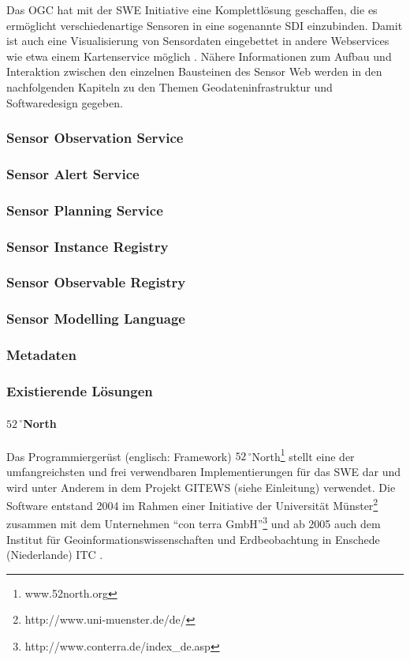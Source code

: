 \citep{botts_ogc_2008}\citep{woolf_gigas_2008}\citep{kunkel_teodoor:_2012}\citep{walkowski_sensor_2008}

Das \gls{OGC} hat mit der \gls{SWE} Initiative eine Komplettlösung geschaffen, die es ermöglicht verschiedenartige Sensoren in eine sogenannte  \gls{SDI} einzubinden. Damit ist auch eine Visualisierung von Sensordaten eingebettet in andere Webservices wie etwa einem Kartenservice möglich \citep{broring_new_2011}. Nähere Informationen zum Aufbau und Interaktion zwischen den einzelnen Bausteinen des Sensor Web werden in den nachfolgenden Kapiteln zu den Themen Geodateninfrastruktur und Softwaredesign gegeben.

\subsubsection{Sensor Observation Service}
\subsubsection{Sensor Alert Service}
\subsubsection{Sensor Planning Service}
\subsubsection{Sensor Instance Registry}
\subsubsection{Sensor Observable Registry}
\subsubsection{Sensor Modelling Language}
\subsubsection{Metadaten}

\subsubsection{Existierende Lösungen}
\paragraph{$52\,^{\circ}$North}
Das Programmiergerüst (englisch: Framework) $52\,^{\circ}$North\footnote{www.52north.org} stellt eine der umfangreichsten und frei verwendbaren Implementierungen für das \gls{SWE} dar und wird unter Anderem in dem Projekt \gls{GITEWS} (siehe Einleitung) verwendet. Die Software entstand 2004 im Rahmen einer Initiative der Universität Münster\footnote{http://www.uni-muenster.de/de/} zusammen mit dem Unternehmen ``con terra GmbH''\footnote{http://www.conterra.de/index\_de.asp} und ab 2005 auch dem Institut für Geoinformationswissenschaften und Erdbeobachtung in Enschede (Niederlande) \gls{ITC} \citep{botts_ogc_2008}\citep{kraak_what_2005}. 

